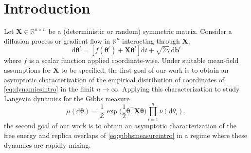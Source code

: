 \documentclass[11pt,letterpaper,reqno]{amsart}
\def\R{\mathbb{R}}
\def\d{\mathrm{d}}
\def\btheta{\boldsymbol{\theta}}
\def\X{\mathbf{X}}
\def\b{\mathbf{b}}
\def\cZ{\mathcal{Z}}
\theoremstyle{definition}
\numberwithin{equation}{section}
\begin{document}
\maketitle

\tableofcontents

\section{Introduction}

Let $\X \in \R^{n \times n}$ be a (deterministic or random) symmetric matrix. 
Consider a diffusion process or gradient flow in $\R^n$ interacting through $\X$,
\begin{equation}\label{eq:dynamicsintro}
\d\btheta^t=[f(\btheta^t)+\X\btheta^t]\d t+\sqrt{2\gamma}\,\d\b^t
\end{equation}
where $f$ is a scalar function applied coordinate-wise. Under suitable mean-field
assumptions for $\X$ to be specified, the first goal of our work is to obtain
an asymptotic characterization of the empirical distribution of coordinates of
\eqref{eq:dynamicsintro} in the limit $n \to \infty$. Applying this
characterization to study Langevin dynamics for the Gibbs measure
\begin{equation}\label{eq:gibbsmeasureintro}
\mu(\d\btheta)=\frac{1}{\cZ}\exp\Big(\frac{1}{2}\btheta^\top \X\btheta\Big)
\prod_{i=1}^n \nu(\d\theta_i),
\end{equation}
the second goal of our work is to obtain an asymptotic characterization of the
free energy and replica overlaps of \eqref{eq:gibbsmeasureintro}
in a regime where these dynamics are rapidly mixing.
\end{document}
